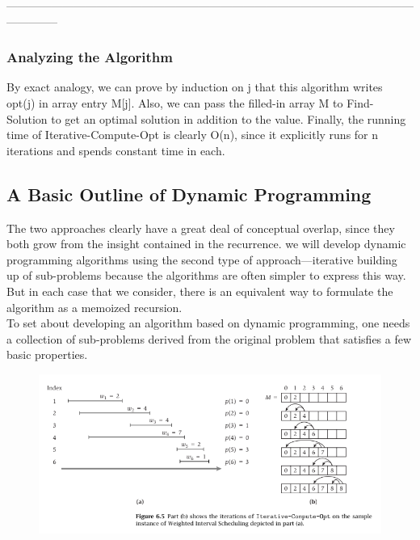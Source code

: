 \documentclass{article}
\begin{document}
 
\medskip

--------------------------------------------------------------------------------------------------------------------------
\medskip

\subsubsection{Analyzing the Algorithm}
By exact analogy, we can prove by induction on j that this algorithm writes opt(j) in array entry M[j]. Also, we can pass the filled-in array M to Find-Solution to get an optimal solution in addition to the value. Finally, the running time of Iterative-Compute-Opt is clearly O(n), since it explicitly runs for n iterations and spends constant time in each.\\

\subsection{A Basic Outline of Dynamic Programming}
The two approaches clearly have a great deal of conceptual overlap, since they both grow from the insight contained in the recurrence. we will develop dynamic programming algorithms using the second type of approach—iterative building up of sub-problems because the algorithms are often simpler to express this way. But in each case that we consider, there is an equivalent way to formulate the algorithm as a memoized recursion.\\

To set about developing an algorithm based on dynamic programming, one needs a collection of sub-problems derived from the original problem that satisfies a few basic properties.

\begin{figure}[htbp]
    \centering
    \includegraphics[width=\textwidth]{figures/fig9.png}
\end{figure}
\end{document}
